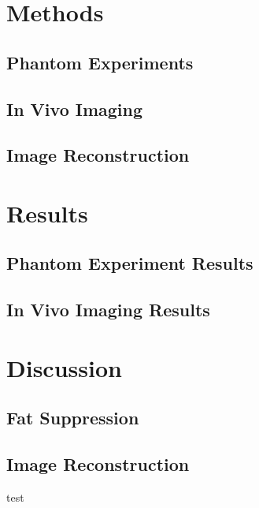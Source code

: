 \documentclass{beamer}
\begin{document}
\section{Methods}
\subsection{Phantom Experiments}
\subsection{In Vivo Imaging}
\subsection{Image Reconstruction}

\section{Results}
\subsection{Phantom Experiment Results}
\subsection{In Vivo Imaging Results}

\section{Discussion}

%

\subsection{Fat Suppression}
\subsection{Image Reconstruction}

\begin{frame}{test}
\end{frame}
\end{document}
